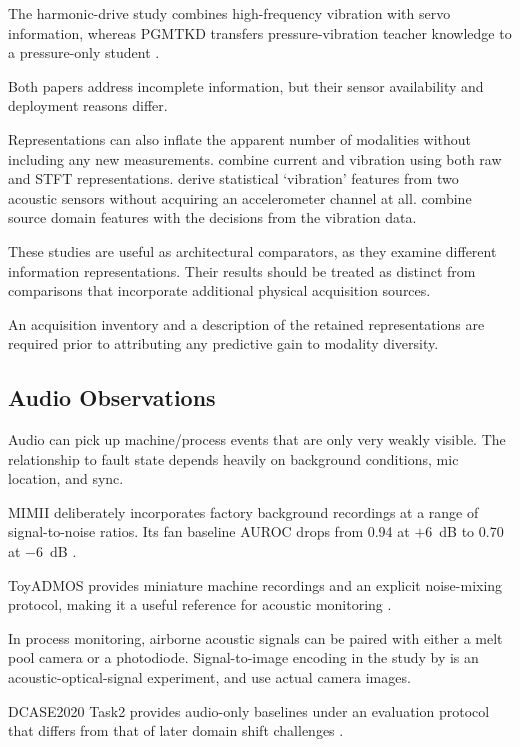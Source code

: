 The harmonic-drive study combines high-frequency vibration with servo information, whereas PGMTKD
transfers pressure-vibration teacher knowledge to a pressure-only student
\parencite{Yang2024Fault,Li2025PGMTKD}.

Both papers address incomplete information, but their sensor availability and deployment reasons
differ.

Representations can also inflate the apparent number of modalities without including any new
measurements. \textcite{Kullu2022A} combine current and vibration using both raw and STFT representations.
\textcite{Wan2024Pipeline} derive statistical `vibration' features from two acoustic sensors
without acquiring an accelerometer channel at all. \textcite{Wang2025A} combine
source domain features with the decisions from the vibration data.

These studies are useful as architectural comparators, as they examine different information
representations. Their results should be treated as distinct from comparisons that
incorporate additional physical acquisition sources.

An acquisition inventory and a description of the retained representations are required prior to
attributing any predictive gain to modality diversity.

\subsection{Audio Observations}

Audio can pick up machine/process events that are only very weakly visible. The relationship to
fault state depends heavily on background conditions, mic location, and sync.

MIMII deliberately incorporates factory background recordings at a range of signal-to-noise ratios.
Its fan baseline AUROC drops from 0.94 at $+6$~dB to 0.70 at $-6$~dB \parencite[Table~3]{Purohit2019MIMII}.

ToyADMOS provides miniature machine recordings and an explicit noise-mixing protocol, making it a
useful reference for acoustic monitoring \parencite{Koizumi2019ToyADMOS}.

In process monitoring, airborne acoustic signals can be paired with either a melt pool camera or a
photodiode. Signal-to-image encoding in the study by \textcite{Li2022A} is an acoustic-optical-signal experiment,
and \textcite{Xie2025Audiovisual} use actual camera images.

DCASE2020 Task2 provides audio-only baselines under an evaluation protocol that differs from that of
later domain shift challenges \parencite{Koizumi2020Description}.

